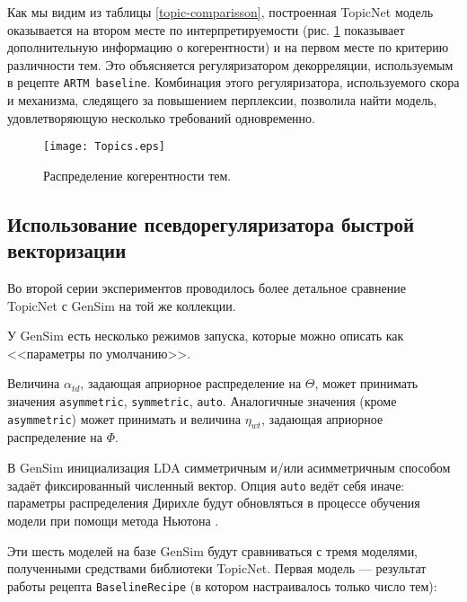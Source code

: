 Как мы видим из таблицы \ref{topic-comparisson}, построенная TopicNet модель  оказывается на втором месте по интерпретируемости (рис. \ref{topics_distribution} показывает дополнительную информацию о когерентности) и на первом месте по критерию различности тем. Это объясняется регуляризатором декорреляции, используемым в рецепте \texttt{ARTM baseline}. Комбинация этого регуляризатора, используемого скора и механизма, следящего за повышением перплексии, позволила найти модель, удовлетворяющую несколько требований одновременно.  

\begin{figure}[!ht]

    \centering

    \texttt{[image: Topics.eps]}

    \caption{Распределение когерентности тем.}

\label{topics_distribution}

\end{figure} 

\subsection{Использование псевдорегуляризатора быстрой векторизации} 

Во второй серии экспериментов проводилось более детальное сравнение TopicNet с GenSim на той же коллекции.  

У GenSim есть несколько режимов запуска, которые можно описать как <<параметры по умолчанию>>.  

Величина $\alpha_{td}$, задающая априорное распределение на $\Theta$, может принимать значения \texttt{asymmetric}, \texttt{symmetric}, \texttt{auto}. Аналогичные значения (кроме \texttt{asymmetric}) может принимать и величина $\eta_{wt}$, задающая априорное распределение на $\Phi$.  

В GenSim инициализация LDA симметричным и/или асимметричным способом задаёт фиксированный численный вектор. Опция \texttt{auto} ведёт себя иначе: параметры распределения Дирихле будут обновляться в процессе обучения модели при помощи метода Ньютона \cite{huang2005maximum}.  

Эти шесть моделей на базе GenSim будут сравниваться с тремя моделями, полученными средствами библиотеки TopicNet. Первая модель --- результат работы рецепта \texttt{BaselineRecipe} (в котором настраивалось только число тем): 

